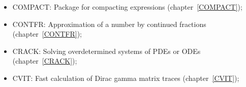 \begin{itemize}
\item
{COMPACT: Package for compacting expressions} (chapter~\ref{COMPACT});

\item
{CONTFR: Approximation of a number by continued fractions}
(chapter~\ref{CONTFR}); 

\item
{CRACK: Solving overdetermined systems of PDEs or ODEs}
(chapter~\ref{CRACK}); 

\item
{CVIT: Fast calculation of Dirac gamma matrix traces}
(chapter~\ref{CVIT}); 


\end{itemize}
